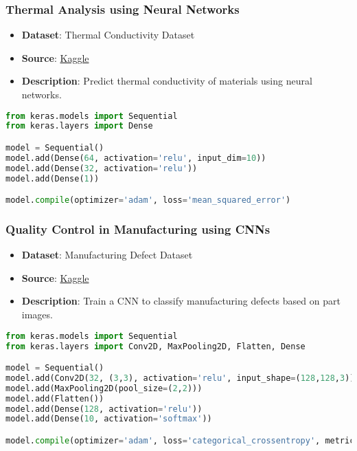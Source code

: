 \begin{frame}[fragile]\frametitle{Thermal Analysis using Neural Networks}
    \begin{itemize}
        \item \textbf{Dataset}: Thermal Conductivity Dataset
        \item \textbf{Source}: \href{https://www.kaggle.com/datasets/sagnik1511/thermal-conductivity-dataset}{Kaggle}
        \item \textbf{Description}: Predict thermal conductivity of materials using neural networks.
    \end{itemize}
    \begin{lstlisting}[language=Python]
from keras.models import Sequential
from keras.layers import Dense

model = Sequential()
model.add(Dense(64, activation='relu', input_dim=10))
model.add(Dense(32, activation='relu'))
model.add(Dense(1))

model.compile(optimizer='adam', loss='mean_squared_error')
    \end{lstlisting}
\end{frame}

\begin{frame}[fragile]\frametitle{Quality Control in Manufacturing using CNNs}
    \begin{itemize}
        \item \textbf{Dataset}: Manufacturing Defect Dataset
        \item \textbf{Source}: \href{https://www.kaggle.com/datasets/yangjianxin1/defect-detection-dataset}{Kaggle}
        \item \textbf{Description}: Train a CNN to classify manufacturing defects based on part images.
    \end{itemize}
    \begin{lstlisting}[language=Python]
from keras.models import Sequential
from keras.layers import Conv2D, MaxPooling2D, Flatten, Dense

model = Sequential()
model.add(Conv2D(32, (3,3), activation='relu', input_shape=(128,128,3)))
model.add(MaxPooling2D(pool_size=(2,2)))
model.add(Flatten())
model.add(Dense(128, activation='relu'))
model.add(Dense(10, activation='softmax'))

model.compile(optimizer='adam', loss='categorical_crossentropy', metrics=['accuracy'])
    \end{lstlisting}
\end{frame}

